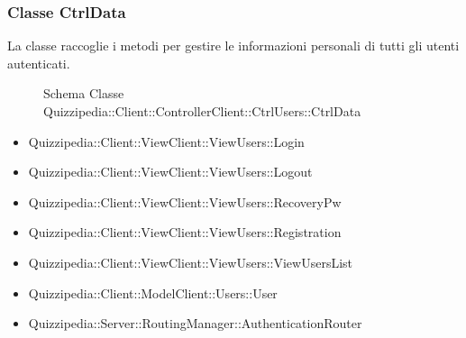 \subsubsection{Classe CtrlData}
La classe raccoglie i metodi per gestire le informazioni personali di tutti gli utenti autenticati.
\begin{figure}[H]
\centering
\noindent{}
\caption[Schema Classe CtrlData]{Schema Classe Quizzipedia::Client::ControllerClient::CtrlUsers::CtrlData}
\end{figure}
\begin{itemize}
\item Quizzipedia::Client::ViewClient::ViewUsers::Login
\item Quizzipedia::Client::ViewClient::ViewUsers::Logout
\item Quizzipedia::Client::ViewClient::ViewUsers::RecoveryPw
\item Quizzipedia::Client::ViewClient::ViewUsers::Registration
\item Quizzipedia::Client::ViewClient::ViewUsers::ViewUsersList
\end{itemize}
\begin{itemize}
\item Quizzipedia::Client::ModelClient::Users::User
\item Quizzipedia::Server::RoutingManager::AuthenticationRouter
\end{itemize}
